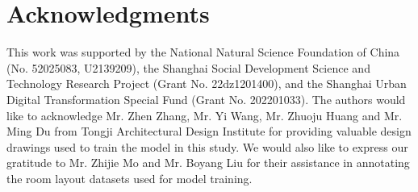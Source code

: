 \documentclass[final,5p,times,twocolumn, fleqn]{elsarticle}
\begin{document}
\section*{Acknowledgments}
This work was supported by the National Natural Science Foundation of China (No. 52025083, U2139209), the Shanghai Social Development Science and Technology Research Project (Grant No. 22dz1201400), and the Shanghai Urban Digital Transformation Special Fund (Grant No. 202201033). The authors would like to acknowledge Mr. Zhen Zhang, Mr. Yi Wang, Mr. Zhuoju Huang and Mr. Ming Du from Tongji Architectural Design Institute for providing valuable design drawings used to train the model in this study. We would also like to express our gratitude to Mr. Zhijie Mo and Mr. Boyang Liu for their assistance in annotating the room layout datasets used for model training.


% 

 






\end{document}
